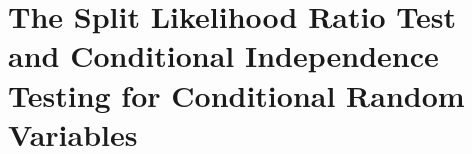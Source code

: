 \section{The Split Likelihood Ratio Test and Conditional Independence Testing for Conditional Random Variables}

